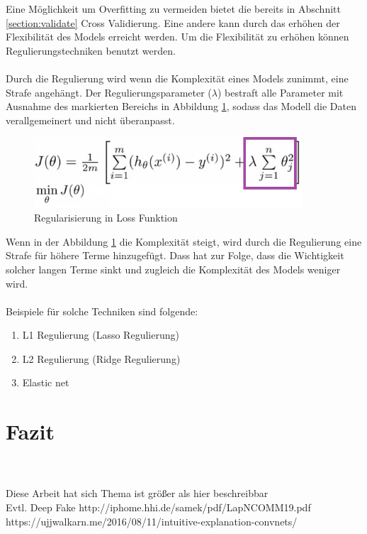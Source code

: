 \documentclass[12pt,oneside,a4paper,parskip]{scrbook}
\begin{document}
Eine Möglichkeit um Overfitting zu vermeiden bietet die bereits in Abschnitt \ref{section:validate} Cross Validierung. Eine andere kann durch das erhöhen der Flexibilität des Models erreicht werden. Um die Flexibilität zu erhöhen können Regulierungstechniken benutzt werden.
\\\\
Durch die Regulierung wird wenn die Komplexität eines Models zunimmt, eine Strafe angehängt. Der Regulierungsparameter (${\lambda}$) bestraft alle Parameter mit Ausnahme des markierten Bereichs in Abbildung \ref{fig:regFunc}, sodass das Modell die Daten verallgemeinert und nicht überanpasst.

\begin{figure}[h]
	\begin{center}
		\includegraphics[width=10cm]{Bilder/regFunc.png}
		\caption{Regularisierung in Loss Funktion}
		\label{fig:regFunc}
	\end{center}
\end{figure}

Wenn in der Abbildung \ref{fig:regFunc} die Komplexität steigt, wird durch die Regulierung eine Strafe für höhere Terme hinzugefügt. Dass hat zur Folge, dass die Wichtigkeit solcher langen Terme sinkt und zugleich die Komplexität des Models weniger wird.
\\\\
Beispiele für solche Techniken sind folgende:

\begin{enumerate}
	\item L1 Regulierung (Lasso Regulierung)
	\item L2 Regulierung (Ridge Regulierung)
	\item Elastic net
\end{enumerate}


\chapter{Fazit}

\\\\
Diese Arbeit hat sich 
Thema ist größer als hier beschreibbar
\\Evtl. Deep Fake
http://iphome.hhi.de/samek/pdf/LapNCOMM19.pdf
https://ujjwalkarn.me/2016/08/11/intuitive-explanation-convnets/


\backmatter


\cleardoublepage
{}
{}
\printbibliography
\end{document}

